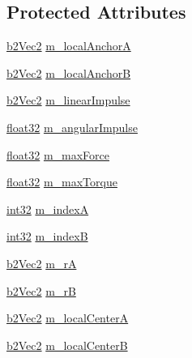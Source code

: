 \subsection*{Protected Attributes}
\begin{DoxyCompactItemize}
\item 
\mbox{\hyperlink{structb2_vec2}{b2\+Vec2}} \mbox{\hyperlink{classb2_friction_joint_a8842818b75319de1e4f3ec70d784dce1}{m\+\_\+local\+AnchorA}}
\item 
\mbox{\hyperlink{structb2_vec2}{b2\+Vec2}} \mbox{\hyperlink{classb2_friction_joint_aa5920c253c6564bfd04a11e767f2e2db}{m\+\_\+local\+AnchorB}}
\item 
\mbox{\hyperlink{structb2_vec2}{b2\+Vec2}} \mbox{\hyperlink{classb2_friction_joint_ad4f8286af03b0f37a9eec7e9884d7e26}{m\+\_\+linear\+Impulse}}
\item 
\mbox{\hyperlink{b2_settings_8h_aacdc525d6f7bddb3ae95d5c311bd06a1}{float32}} \mbox{\hyperlink{classb2_friction_joint_ab199dba9687ece4b816589b9e1e14750}{m\+\_\+angular\+Impulse}}
\item 
\mbox{\hyperlink{b2_settings_8h_aacdc525d6f7bddb3ae95d5c311bd06a1}{float32}} \mbox{\hyperlink{classb2_friction_joint_ae666a8093844e2fb75e4c3de6b3f377a}{m\+\_\+max\+Force}}
\item 
\mbox{\hyperlink{b2_settings_8h_aacdc525d6f7bddb3ae95d5c311bd06a1}{float32}} \mbox{\hyperlink{classb2_friction_joint_a42b3ac5d34ab2399a5e4f0ea9afe988d}{m\+\_\+max\+Torque}}
\item 
\mbox{\hyperlink{b2_settings_8h_a43d43196463bde49cb067f5c20ab8481}{int32}} \mbox{\hyperlink{classb2_friction_joint_a069c815e1cdf78160cb96b4b0047f64e}{m\+\_\+indexA}}
\item 
\mbox{\hyperlink{b2_settings_8h_a43d43196463bde49cb067f5c20ab8481}{int32}} \mbox{\hyperlink{classb2_friction_joint_a378198c55100884de4587cb9ab22128f}{m\+\_\+indexB}}
\item 
\mbox{\hyperlink{structb2_vec2}{b2\+Vec2}} \mbox{\hyperlink{classb2_friction_joint_aa02b166017af5893b6b49b56dc96c70a}{m\+\_\+rA}}
\item 
\mbox{\hyperlink{structb2_vec2}{b2\+Vec2}} \mbox{\hyperlink{classb2_friction_joint_a99b95a2dbfb119cbccccb137748aca44}{m\+\_\+rB}}
\item 
\mbox{\hyperlink{structb2_vec2}{b2\+Vec2}} \mbox{\hyperlink{classb2_friction_joint_af732965abe1f29f7469e1ea17506218c}{m\+\_\+local\+CenterA}}
\item 
\mbox{\hyperlink{structb2_vec2}{b2\+Vec2}} \mbox{\hyperlink{classb2_friction_joint_a55739866c1f3423caf2116e0a869ec45}{m\+\_\+local\+CenterB}}

\end{DoxyCompactItemize}
